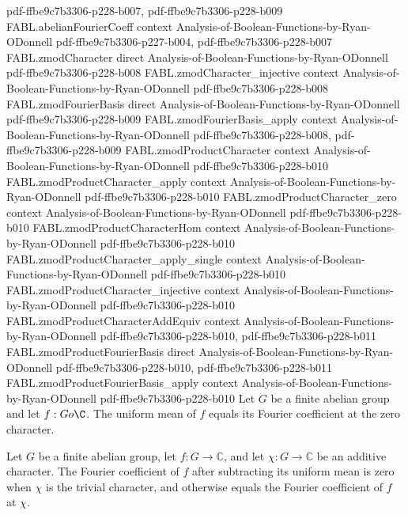 \begin{theorem}
  {pdf-ffbe9c7b3306-p228-b007,
    pdf-ffbe9c7b3306-p228-b009}
\proofstep
  {FABL.abelianFourierCoeff}
  {context}
  {Analysis-of-Boolean-Functions-by-Ryan-ODonnell}
  {pdf-ffbe9c7b3306-p227-b004,
    pdf-ffbe9c7b3306-p228-b007}
\proofstep
  {FABL.zmodCharacter}
  {direct}
  {Analysis-of-Boolean-Functions-by-Ryan-ODonnell}
  {pdf-ffbe9c7b3306-p228-b008}
\proofstep
  {FABL.zmodCharacter_injective}
  {context}
  {Analysis-of-Boolean-Functions-by-Ryan-ODonnell}
  {pdf-ffbe9c7b3306-p228-b008}
\proofstep
  {FABL.zmodFourierBasis}
  {direct}
  {Analysis-of-Boolean-Functions-by-Ryan-ODonnell}
  {pdf-ffbe9c7b3306-p228-b009}
\proofstep
  {FABL.zmodFourierBasis_apply}
  {context}
  {Analysis-of-Boolean-Functions-by-Ryan-ODonnell}
  {pdf-ffbe9c7b3306-p228-b008,
    pdf-ffbe9c7b3306-p228-b009}
\proofstep
  {FABL.zmodProductCharacter}
  {context}
  {Analysis-of-Boolean-Functions-by-Ryan-ODonnell}
  {pdf-ffbe9c7b3306-p228-b010}
\proofstep
  {FABL.zmodProductCharacter_apply}
  {context}
  {Analysis-of-Boolean-Functions-by-Ryan-ODonnell}
  {pdf-ffbe9c7b3306-p228-b010}
\proofstep
  {FABL.zmodProductCharacter_zero}
  {context}
  {Analysis-of-Boolean-Functions-by-Ryan-ODonnell}
  {pdf-ffbe9c7b3306-p228-b010}
\proofstep
  {FABL.zmodProductCharacterHom}
  {context}
  {Analysis-of-Boolean-Functions-by-Ryan-ODonnell}
  {pdf-ffbe9c7b3306-p228-b010}
\proofstep
  {FABL.zmodProductCharacter_apply_single}
  {context}
  {Analysis-of-Boolean-Functions-by-Ryan-ODonnell}
  {pdf-ffbe9c7b3306-p228-b010}
\proofstep
  {FABL.zmodProductCharacter_injective}
  {context}
  {Analysis-of-Boolean-Functions-by-Ryan-ODonnell}
  {pdf-ffbe9c7b3306-p228-b010}
\proofstep
  {FABL.zmodProductCharacterAddEquiv}
  {context}
  {Analysis-of-Boolean-Functions-by-Ryan-ODonnell}
  {pdf-ffbe9c7b3306-p228-b010,
    pdf-ffbe9c7b3306-p228-b011}
\proofstep
  {FABL.zmodProductFourierBasis}
  {direct}
  {Analysis-of-Boolean-Functions-by-Ryan-ODonnell}
  {pdf-ffbe9c7b3306-p228-b010,
    pdf-ffbe9c7b3306-p228-b011}
\proofstep
  {FABL.zmodProductFourierBasis_apply}
  {context}
  {Analysis-of-Boolean-Functions-by-Ryan-ODonnell}
  {pdf-ffbe9c7b3306-p228-b010}
Let $G$ be a finite abelian group and let $f:G	o\C$. The uniform mean of $f$ equals its
Fourier coefficient at the zero character.
\end{theorem}

\begin{theorem}
\label{FABL.abelianFourierCoeff_centered}
\leanok
{}
Let $G$ be a finite abelian group, let $f:G\to\mathbb{C}$, and let $\chi:G\to\mathbb{C}$
be an additive character. The Fourier coefficient of $f$ after subtracting its uniform
mean is zero when $\chi$ is the trivial character, and otherwise equals the Fourier
coefficient of $f$ at $\chi$.
\end{theorem}

